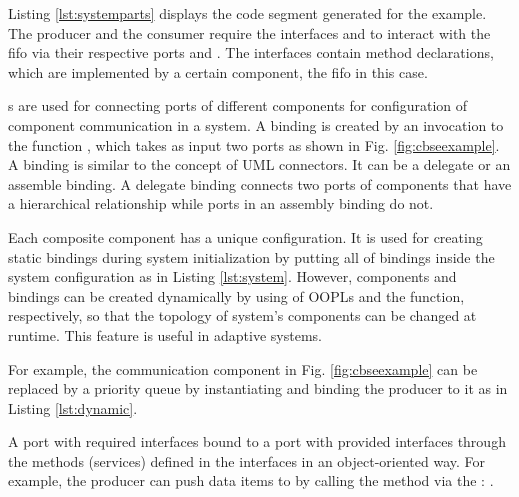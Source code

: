 Listing \ref{lst:systemparts} displays the code segment generated for the example.
The producer and the consumer require the interfaces  and  to interact with the fifo via their respective ports  and .
The interfaces contain method declarations, which are implemented by a certain component, the fifo in this case.

\begin{minipage}{0.95\columnwidth}
	
\end{minipage}

s are used for connecting ports of different components for configuration of component communication in a system.
A binding is created by an invocation to the function , which takes as input two ports as shown in Fig. \ref{fig:cbseexample}.
A binding is similar to the concept of UML connectors.
It can be a delegate or an assemble binding.
A delegate binding connects two ports of components that have a hierarchical relationship while ports in an assembly binding do not.

\vskip 0.03in
\noindent
{}
Each composite component has a unique configuration.
It is used for creating static bindings during system initialization by putting all of bindings inside the system configuration as in Listing \ref{lst:system}.
However, components and bindings can be created dynamically by using  of OOPLs and the  function, respectively, so that the topology of system's components can be changed at runtime. 
This feature is useful in adaptive systems.

For example, the communication component  in Fig. \ref{fig:cbseexample} can be replaced by a priority queue by instantiating  and binding the producer to it as in Listing \ref{lst:dynamic}.

\begin{minipage}{0.95\columnwidth}
	
\end{minipage}

\vskip 0.03in
\noindent
{} A port with required interfaces bound to a port with provided interfaces through the methods (services) defined in the interfaces in an object-oriented way.
For example, the  producer can push data items to  by calling the  method via the : . 

